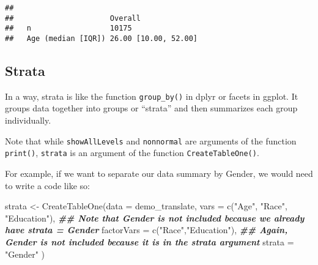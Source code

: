 \documentclass[
]{book}
\newenvironment{Shaded}{\begin{snugshade}}{\end{snugshade}}
\newcommand{\AttributeTok}[1]{\textcolor[rgb]{0.77,0.63,0.00}{#1}}
\newcommand{\DocumentationTok}[1]{\textcolor[rgb]{0.56,0.35,0.01}{\textbf{\textit{#1}}}}
\newcommand{\FunctionTok}[1]{\textcolor[rgb]{0.00,0.00,0.00}{#1}}
\newcommand{\NormalTok}[1]{#1}
\newcommand{\OtherTok}[1]{\textcolor[rgb]{0.56,0.35,0.01}{#1}}
\newcommand{\SpecialCharTok}[1]{\textcolor[rgb]{0.00,0.00,0.00}{#1}}
\newcommand{\StringTok}[1]{\textcolor[rgb]{0.31,0.60,0.02}{#1}}
\begin{document}
\begin{Shaded}
\end{Shaded}

\begin{verbatim}
##                     
##                      Overall             
##   n                  10175               
##   Age (median [IQR]) 26.00 [10.00, 52.00]
\end{verbatim}

\hypertarget{strata}{%
\subsection{Strata}\label{strata}}

In a way, strata is like the function \texttt{group\_by()} in dplyr or facets in ggplot. It groups data together into groups or ``strata'' and then summarizes each group individually.

Note that while \texttt{showAllLevels} and \texttt{nonnormal} are arguments of the function \texttt{print()}, \texttt{strata} is an argument of the function \texttt{CreateTableOne()}.

For example, if we want to separate our data summary by Gender, we would need to write a code like so:

\begin{Shaded}
\begin{Highlighting}[]
\NormalTok{strata }\OtherTok{\textless{}{-}} \FunctionTok{CreateTableOne}\NormalTok{(}\AttributeTok{data =}\NormalTok{ demo\_translate,}
                         \AttributeTok{vars =} \FunctionTok{c}\NormalTok{(}\StringTok{"Age"}\NormalTok{, }\StringTok{"Race"}\NormalTok{, }\StringTok{"Education"}\NormalTok{), }\DocumentationTok{\#\# Note that Gender is not included because we already have strata = Gender}
                         \AttributeTok{factorVars =} \FunctionTok{c}\NormalTok{(}\StringTok{"Race"}\NormalTok{,}\StringTok{"Education"}\NormalTok{), }\DocumentationTok{\#\# Again, Gender is not included because it is in the strata argument}
                         \AttributeTok{strata =} \StringTok{"Gender"}
\NormalTok{                         )}
\end{Highlighting}
\end{Shaded}
\end{document}
